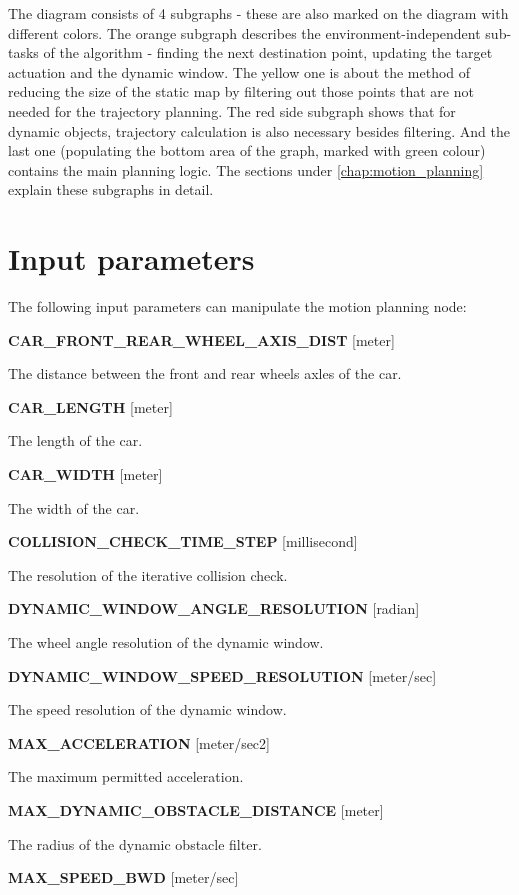 The diagram consists of 4 subgraphs - these are also marked on the diagram with different colors. The orange subgraph describes the environment-independent sub-tasks of the algorithm - finding the next destination point, updating the target actuation and the dynamic window. The yellow one is about the method of reducing the size of the static map by filtering out those points that are not needed for the trajectory planning. The red side subgraph shows that for dynamic objects, trajectory calculation is also necessary besides filtering. And the last one (populating the bottom area of the graph, marked with green colour) contains the main planning logic. The sections under \ref{chap:motion_planning} explain these subgraphs in detail.

\begin{minipage}{\textwidth}
\section{Input parameters}
\label{chap:input_parameters}
The following input parameters can manipulate the motion planning node:

\textbf{CAR\_FRONT\_REAR\_WHEEL\_AXIS\_DIST} [meter]

The distance between the front and rear wheels axles of the car.

\textbf{CAR\_LENGTH} [meter]

The length of the car.

\textbf{CAR\_WIDTH} [meter]

The width of the car.

\textbf{COLLISION\_CHECK\_TIME\_STEP} [millisecond]

The resolution of the iterative collision check.

\textbf{DYNAMIC\_WINDOW\_ANGLE\_RESOLUTION} [radian]

The wheel angle resolution of the dynamic window.

\textbf{DYNAMIC\_WINDOW\_SPEED\_RESOLUTION} [meter/sec]

The speed resolution of the dynamic window.

\textbf{MAX\_ACCELERATION} [meter/sec2]

The maximum permitted acceleration.

\textbf{MAX\_DYNAMIC\_OBSTACLE\_DISTANCE} [meter]

The radius of the dynamic obstacle filter.

\textbf{MAX\_SPEED\_BWD} [meter/sec]


\end{minipage}
